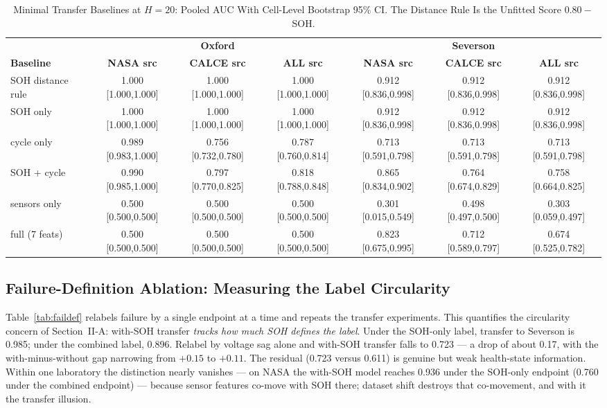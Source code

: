 \begin{table}[!t]
\caption{Minimal Transfer Baselines at $H{=}20$: Pooled AUC With Cell-Level Bootstrap 95\% CI. The Distance Rule Is the Unfitted Score $0.80-$SOH.}
\label{tab:baselines}
\centering
\footnotesize
\setlength{\tabcolsep}{4pt}
\begin{tabular}{lcccccc}
\toprule
 & \multicolumn{3}{c}{\textbf{Oxford}} & \multicolumn{3}{c}{\textbf{Severson}}\\
\cmidrule(lr){2-4}\cmidrule(l){5-7}
\textbf{Baseline} & \textbf{NASA src} & \textbf{CALCE src} & \textbf{ALL src} & \textbf{NASA src} & \textbf{CALCE src} & \textbf{ALL src}\\
\midrule
SOH distance rule & 1.000 [1.000,1.000] & 1.000 [1.000,1.000] & 1.000 [1.000,1.000] & 0.912 [0.836,0.998] & 0.912 [0.836,0.998] & 0.912 [0.836,0.998] \\
SOH only & 1.000 [1.000,1.000] & 1.000 [1.000,1.000] & 1.000 [1.000,1.000] & 0.912 [0.836,0.998] & 0.912 [0.836,0.998] & 0.912 [0.836,0.998] \\
cycle only & 0.989 [0.983,1.000] & 0.756 [0.732,0.780] & 0.787 [0.760,0.814] & 0.713 [0.591,0.798] & 0.713 [0.591,0.798] & 0.713 [0.591,0.798] \\
SOH + cycle & 0.990 [0.985,1.000] & 0.797 [0.770,0.825] & 0.818 [0.788,0.848] & 0.865 [0.834,0.902] & 0.764 [0.674,0.829] & 0.758 [0.664,0.825] \\
sensors only & 0.500 [0.500,0.500] & 0.500 [0.500,0.500] & 0.500 [0.500,0.500] & 0.301 [0.015,0.549] & 0.498 [0.497,0.500] & 0.303 [0.059,0.497] \\
full (7 feats) & 0.500 [0.500,0.500] & 0.500 [0.500,0.500] & 0.500 [0.500,0.500] & 0.823 [0.675,0.995] & 0.712 [0.589,0.797] & 0.674 [0.525,0.782] \\
\bottomrule
\end{tabular}
\end{table}

\subsection{Failure-Definition Ablation: Measuring the Label Circularity}
Table~\ref{tab:faildef} relabels failure by a single endpoint at a time and repeats the transfer experiments. This quantifies the circularity concern of Section~II-A: with-SOH transfer \emph{tracks how much SOH defines the label}. Under the SOH-only label, transfer to Severson is 0.985; under the combined label, 0.896. Relabel by voltage sag alone and with-SOH transfer falls to 0.723 --- a drop of about 0.17, with the with-minus-without gap narrowing from $+0.15$ to $+0.11$. The residual (0.723 versus 0.611) is genuine but weak health-state information. Within one laboratory the distinction nearly vanishes --- on NASA the with-SOH model reaches 0.936 under the SOH-only endpoint (0.760 under the combined endpoint) --- because sensor features co-move with SOH there; dataset shift destroys that co-movement, and with it the transfer illusion.

